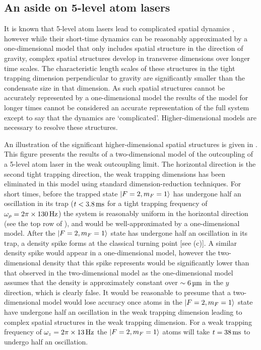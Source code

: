 \subsection{An aside on 5-level atom lasers}
\label{OpticalPumping:5LevelModel}

It is known that 5-level atom lasers lead to complicated spatial dynamics \citep{Dugue:2007fk}, however while their short-time dynamics can be reasonably approximated by a one-dimensional model that only includes spatial structure in the direction of gravity, complex spatial structures develop in transverse dimensions over longer time scales.  The characteristic length scales of these structures in the tight trapping dimension perpendicular to gravity are significantly smaller than the condensate size in that dimension.  As such spatial structures cannot be accurately represented by a one-dimensional model the results of the model for longer times cannot be considered an accurate representation of the full system except to say that the dynamics are `complicated'.  Higher-dimensional models are necessary to resolve these structures.

An illustration of the significant higher-dimensional spatial structures is given in .  This figure presents the results of a two-dimensional model of the outcoupling of a 5-level atom laser in the weak outcoupling limit.  The horizontal direction is the second tight trapping direction, the weak trapping dimensions has been eliminated in this model using standard dimension-reduction techniques.  For short times, before the trapped state ${\left|F=2, m_F=1\right>}$ has undergone half an oscillation in its trap ($t < \unit[3.8]{ms}$ for a tight trapping frequency of $\omega_\rho = 2\pi \times \unit[130]{Hz}$) the system is reasonably uniform in the horizontal direction (see the top row of ), and would be well-approximated by a one-dimensional model.  After the ${\left|F=2, m_F=1\right>}$ state has undergone half an oscillation in its trap, a density spike forms at the classical turning point [see (c)].  A similar density spike would appear in a one-dimensional model, however the two-dimensional density that this spike represents would be significantly lower than that observed in the two-dimensional model as the one-dimensional model assumes that the density is approximately constant over $\sim\unit[6]{\micro m}$ in the $y$ direction, which is clearly false.  It would be reasonable to presume that a two-dimensional model would lose accuracy once atoms in the ${\left|F=2, m_F=1\right>}$ state have undergone half an oscillation in the weak trapping dimension leading to complex spatial structures in the weak trapping dimension.  For a weak trapping frequency of $\omega_z = 2\pi \times \unit[13]{Hz}$ the ${\left|F=2, m_F=1\right>}$ atoms will take $t = \unit[38]{ms}$ to undergo half an oscillation.

